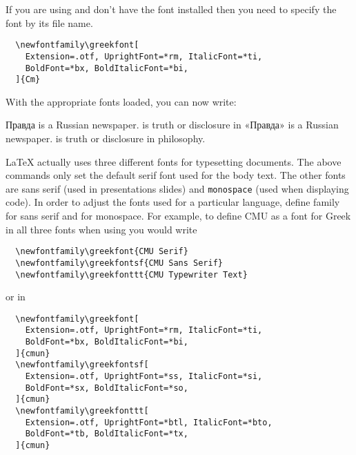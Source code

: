 If you are using  and don't have the font installed then you
need to specify the font by its file name.
\begin{verbatim}
  \newfontfamily\greekfont[
    Extension=.otf, UprightFont=*rm, ItalicFont=*ti,
    BoldFont=*bx, BoldItalicFont=*bi,
  ]{Cm}
\end{verbatim}

With the appropriate fonts loaded, you can now write:
\begin{example}[examplewidth=0.8\linewidth, vertical_mode,noextend]
\newfontfamily{}
\newfontfamily{}

\begin{chktexignore} %
\textrussian{Правда} is a Russian newspaper. %
 is truth or disclosure in %
\textrussian{«Правда»} is a Russian newspaper.
 is truth or disclosure in
philosophy.
\end{chktexignore} %
\end{example}

\LaTeX{} actually uses three different fonts for typesetting documents. The
above commands only set the default serif font used for the body text. The
other fonts are \textsf{sans serif} (used in presentations slides) and
\texttt{monospace} (used when displaying code). In order to adjust the fonts
used for a particular language, define  family
for sans serif and  for monospace. For example,
to define CMU as a font for Greek in all three fonts when using
 you would write
\begin{verbatim}
  \newfontfamily\greekfont{CMU Serif}
  \newfontfamily\greekfontsf{CMU Sans Serif}
  \newfontfamily\greekfonttt{CMU Typewriter Text}
\end{verbatim}
\pagebreak[3]
or in 
\begin{verbatim}
  \newfontfamily\greekfont[
    Extension=.otf, UprightFont=*rm, ItalicFont=*ti,
    BoldFont=*bx, BoldItalicFont=*bi,
  ]{cmun}
  \newfontfamily\greekfontsf[
    Extension=.otf, UprightFont=*ss, ItalicFont=*si,
    BoldFont=*sx, BoldItalicFont=*so, 
  ]{cmun}
  \newfontfamily\greekfonttt[
    Extension=.otf, UprightFont=*btl, ItalicFont=*bto,
    BoldFont=*tb, BoldItalicFont=*tx, 
  ]{cmun}
\end{verbatim}

